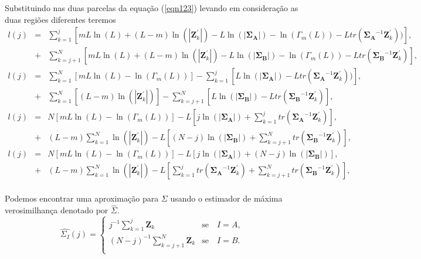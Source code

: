 \documentclass[12pt,a4paper]{article}
\begin{document}
Substituindo nas duas parcelas da equação (\ref{eqn123}) levando em consideração as duas regiões diferentes teremos
\begin{equation*}
\begin{array}{rcl}
	l(j)&=&\sum_{k=1}^{j}\left[mL\ln{\left(L\right)}+(L-m)\ln{\left(|\mathbf{Z}_{k}^{'}|\right)}- L\ln{\left(|\mathbf{\Sigma_{A}}|\right)}-\ln{\left(\Gamma_m(L)\right)}-L tr(\mathbf{\Sigma_{A}}^{-1}\mathbf{Z}_{k}^{'}))\right], \\
	&+&\sum_{k=j+1}^{N}\left[mL\ln{\left(L\right)}+(L-m)\ln{\left(|\mathbf{Z}_{k}^{'}|\right)}- L\ln{\left(|\mathbf{\Sigma_{B}}|\right)}-\ln{\left(\Gamma_m(L)\right)}-L tr(\mathbf{\Sigma_{B}}^{-1}\mathbf{Z}_{k}^{'})\right], \\
	l(j)&=&\sum_{k=1}^{N}\left[mL\ln{\left(L\right)}-\ln{\left(\Gamma_m(L)\right)}\right]-\sum_{k=1}^{j}\left[ L\ln{\left(|\mathbf{\Sigma_{A}}|\right)}-L tr(\mathbf{\Sigma_{A}}^{-1}\mathbf{Z}_{k}^{'}))\right], \\
	&+&\sum_{k=1}^{N}\left[(L-m)\ln{\left(|\mathbf{Z}_{k}^{'}|\right)}\right]- \sum_{k=j+1}^{N}\left[L\ln{\left(|\mathbf{\Sigma_{B}}|\right)}-L tr(\mathbf{\Sigma_{B}}^{-1}\mathbf{Z}_{k}^{'})\right], \\
	l(j)&=&N\left[mL\ln{\left(L\right)}-\ln{\left(\Gamma_m(L)\right)}\right]-L\left[j\ln{\left(|\mathbf{\Sigma_{A}}|\right)} +\sum_{k=1}^{j}tr(\mathbf{\Sigma_{A}}^{-1}\mathbf{Z}_{k}^{'})\right], \\
	&+&(L-m)\sum_{k=1}^{N}\ln{\left(|\mathbf{Z}_{k}^{'}|\right)}-L\left[(N-j)\ln{\left(|\mathbf{\Sigma_{B}}|\right)}+ \sum_{k=j+1}^{N}tr(\mathbf{\Sigma_{B}}^{-1}\mathbf{Z}_{k}^{'})\right], \\
	l(j)&=&N\left[mL\ln{\left(L\right)}-\ln{\left(\Gamma_m(L)\right)}\right]-L\left[j\ln{\left(|\mathbf{\Sigma_{A}}|\right)} +(N-j)\ln{\left(|\mathbf{\Sigma_{B}}|\right)}\right], \\
	&+&(L-m)\sum_{k=1}^{N}\ln{\left(|\mathbf{Z}_{k}^{'}|\right)}-L\left[\sum_{k=1}^{j}tr(\mathbf{\Sigma_{A}}^{-1}\mathbf{Z}_{k}^{'})+ \sum_{k=j+1}^{N}tr(\mathbf{\Sigma_{B}}^{-1}\mathbf{Z}_{k}^{'})\right], \\
\end{array}
\end{equation*}

Podemos encontrar uma aproximação para $\Sigma$ usando o estimador de máxima verosimilhança denotado por $\widehat{\Sigma}$.
$$
\widehat{\Sigma_{I}}(j) = \left\{
\begin{array}{lc}
	j^{-1}\sum_{k=1}^{j}\mathbf{Z}_{k}  & \mbox{se}\quad I=A,  \\
        (N-j)^{-1}\sum_{k=j+1}^{N}\mathbf{Z}_{k} & \mbox{se}\quad I=B. \\
\end{array}
\right.
$$
\end{document}

